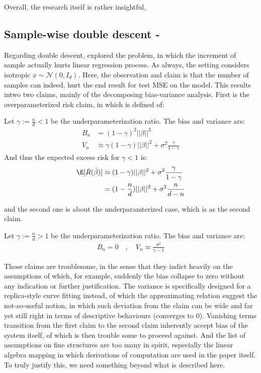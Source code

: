 \documentclass[
  journal=largetwo,
  year=2025,
  volume=37,
]{cup-journal}
\begin{document}
Overall, the research itself is rather insightful, 

\subsection{Sample-wise double descent - \cite{nakkiran2019moredata}}

Regarding double descent, \cite{nakkiran2019moredata} explored the problem, in which the increment of sample actually hurts linear regression process. As always, the setting considers isotropic $x\sim\mathcal{N}(0,I_{d})$. Here, the observation and claim is that the number of samples can indeed, hurt the end result for test MSE on the model. This results intwo two claims, mainly of the decomposing bias-variance analysis. First is the overparameterized risk claim, in which is defined of:

\begin{claim}
\label{claim:main}
Let $\gamma := \frac{n}{d} < 1$ be the underparameterization ratio.
The bias and variance are:
\begin{align}
B_n &= (1-\gamma)^2||\beta||^2\\
V_n &\approx \gamma(1-\gamma)||\beta||^2
+ \sigma^2 \frac{\gamma}{1-\gamma}
\end{align}
And thus the expected excess risk for $\gamma < 1$ is:
\begin{align}
\E[\bar R (\hbeta) ]
&\approx (1-\gamma)||\beta||^2
+ \sigma^2 \frac{\gamma}{1-\gamma}\\
&= (1-\frac{n}{d})||\beta||^2
+ \sigma^2 \frac{n}{d-n}
\end{align}
\end{claim}
and the second one is about the underparamterized case, which is as the second claim. 
\begin{claim}
\label{claim:underparam}
Let $\gamma := \frac{n}{d} > 1$ be the underparameterization ratio.
The bias and variance are:
\begin{align*}
B_n = 0 \quad, \quad
V_n \approx \frac{\sigma^2}{\gamma - 1}
\end{align*}
\end{claim}

Those claims are troublesome, in the sense that they indict heavily on the assumptions of which, for example, suddenly the bias collapse to zero without any indication or further justification. The variance is specifically designed for a replica-style curve fitting instead, of which the approximating relation suggest the not-so-useful notion, in which such deviation from the claim can be wide and far yet still right in terms of descriptive behaviours (converges to $0$). Vanishing terms transition from the first claim to the second claim inherently accept bias of the system itself, of which is then trouble some to proceed against. And the list of assumptions on fine structures are too many in spirit, especially the linear algebra mapping in which derivations of computation are used in the paper itself. To truly justify this, we need something beyond what is described here. 
\end{document}
